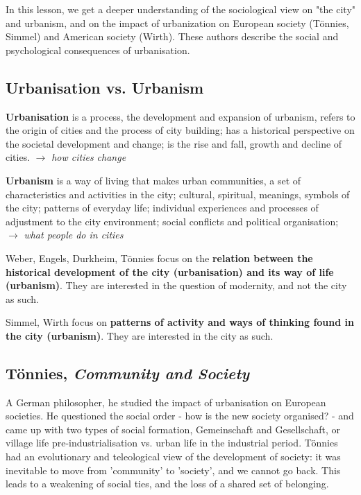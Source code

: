 \documentclass{article}
\begin{document}
In this lesson, we get a deeper understanding of the sociological view on "the city" and urbanism, and on the impact of urbanization on European society (Tönnies, Simmel) and American society (Wirth). These authors describe the social and psychological consequences of urbanisation.

\subsection{Urbanisation vs. Urbanism}

\textbf{Urbanisation} is a process, the development and expansion of urbanism, refers to the origin of cities and the process of city building; has a historical perspective on the societal development and change; is the rise and fall, growth and decline of cities. $\rightarrow$ \textit{how cities change}

\textbf{Urbanism} is a way of living that makes urban communities, a set of characteristics and activities in the city;  cultural, spiritual, meanings, symbols of the city; patterns of everyday life; individual experiences and processes of adjustment to the city environment; social conflicts and political organisation; $\rightarrow$ \textit{what people do in cities}

Weber, Engels, Durkheim, Tönnies focus on the \textbf{relation between the historical development of the city (urbanisation) and its way of life (urbanism)}. They are interested in the question of modernity, and not the city as such.

Simmel, Wirth focus on \textbf{patterns of activity and ways of thinking found in the city (urbanism)}. They are interested in the city as such.

\subsection{Tönnies, \textit{Community and Society}}

A German philosopher, he studied the impact of urbanisation on European societies. He questioned the social order - how is the new society organised? - and came up with two types of social formation, Gemeinschaft and Gesellschaft, or village life pre-industrialisation vs. urban life in the industrial period.
Tönnies had an evolutionary and teleological view of the development of society: it was inevitable to move from 'community' to 'society', and we cannot go back. This leads to a weakening of social ties, and the loss of a shared set of belonging. 
\end{document}
